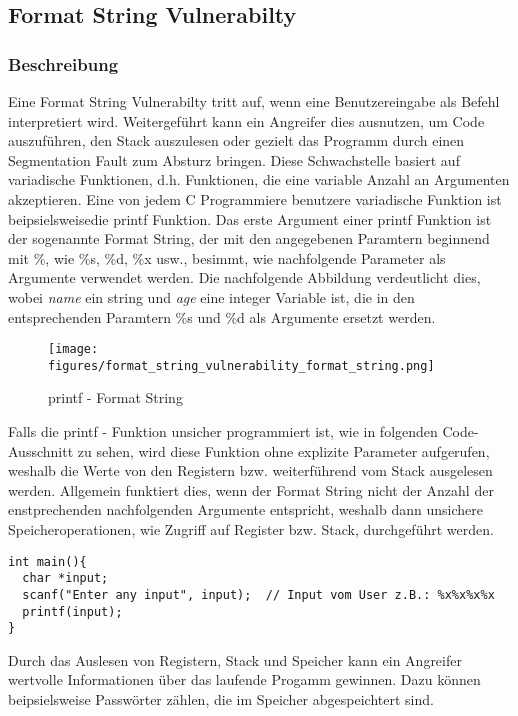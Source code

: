 \documentclass[a4paper,
DIV=13,
12pt,
BCOR=10mm,
department=FakIM,
oneside,
parskip=half,
automark,
listof=totocnumbered,
bibliography=totocnumbered,
acronym=totocnumbered
] {OTHRartcl}
\begin{document}
\subsection{Format String Vulnerabilty}
\subsubsection{Beschreibung}
Eine Format String Vulnerabilty tritt auf, wenn eine Benutzereingabe als Befehl interpretiert wird.
Weitergeführt kann ein Angreifer dies ausnutzen, um Code auszuführen, den Stack auszulesen oder gezielt das Programm durch einen Segmentation Fault zum Absturz bringen.
Diese Schwachstelle basiert auf variadische Funktionen, d.h. Funktionen, die eine variable Anzahl an Argumenten akzeptieren.
Eine von jedem C Programmiere benutzere variadische Funktion ist beipsielsweisedie printf Funktion.
Das erste Argument einer printf Funktion ist der sogenannte Format String, der mit den angegebenen Paramtern beginnend mit \%, wie \%s, \%d, \%x usw., besimmt, wie nachfolgende Parameter
als Argumente verwendet werden.
Die nachfolgende Abbildung verdeutlicht dies, wobei \textit{name} ein string und \textit{age} eine integer Variable ist, die in den entsprechenden
Paramtern \%s und \%d als Argumente ersetzt werden.
\begin{figure}[ht!]
  \begin{center}
    \texttt{[image: figures/format\_string\_vulnerability\_format\_string.png]}
    \caption{printf - Format String}
    \label{fig: printf - Format String}
  \end{center}
\end{figure}

Falls die printf - Funktion unsicher programmiert ist, wie in folgenden Code-Ausschnitt zu sehen,
wird diese Funktion ohne explizite Parameter aufgerufen, weshalb die Werte von den Registern bzw. weiterführend vom Stack ausgelesen werden.
Allgemein funktiert dies, wenn der Format String nicht der Anzahl der enstprechenden nachfolgenden Argumente entspricht, weshalb dann unsichere Speicheroperationen, wie Zugriff auf Register bzw. Stack,
durchgeführt werden.
\begin{verbatim}
int main(){
  char *input;
  scanf("Enter any input", input);  // Input vom User z.B.: %x%x%x%x
  printf(input);
}
\end{verbatim}
Durch das Auslesen von Registern, Stack und Speicher kann ein Angreifer wertvolle Informationen über das laufende Progamm gewinnen.
Dazu können beipsielsweise Passwörter zählen, die im Speicher abgespeichtert sind.
\end{document}
